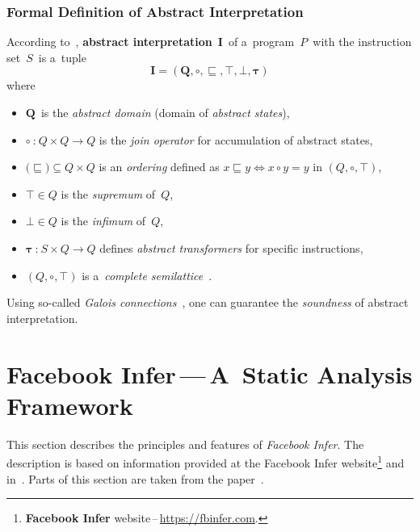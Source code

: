 \subsubsection{Formal Definition of Abstract Interpretation}

According to~\cite{AILatticeModelCousot, favAI},
\textbf{abstract interpretation}~$ \boldsymbol{I} $~of a~program~$ P $~with
the instruction set~$ S $~is a~tuple
$$ \boldsymbol{I = (Q, \circ, \sqsubseteq, \top, \bot, \tau)} $$
where
\begin{itemize}
    \item
        $ \boldsymbol{Q} $~is the \emph{abstract domain} (domain of
        \emph{abstract states}),

    \item
        $ \boldsymbol{\circ}~\text{:}~Q \times Q \rightarrow Q $
        is the \emph{join operator} for accumulation of abstract states,

    \item
        $ \text{(}\boldsymbol{\sqsubseteq}\text{)} \subseteq Q \times Q $ is
        an \emph{ordering} defined as
        $ x \sqsubseteq y \Leftrightarrow x \circ y = y $ in
        $ (Q, \circ, \top) $,

    \item
        $ \boldsymbol{\top} \in Q $ is the \emph{supremum} of~$ Q $,

    \item
        $ \boldsymbol{\bot} \in Q $ is the \emph{infimum} of~$ Q $,

    \item
        $ \boldsymbol{\tau}~\text{:}~S \times Q \rightarrow Q $
        defines \emph{abstract transformers} for specific instructions,

    \item
        $ (Q, \circ, \top) $ is a~\emph{complete
        semilattice}~\cite{favLatticesAndFixpoints, favAI}.
\end{itemize}

Using so-called \emph{Galois connections}~\cite{programAnalysisNielson,
wideningNarrowingCousot, favAI, AICousotWeb}, one can guarantee the
\emph{soundness} of abstract interpretation.


\section{\texorpdfstring{Facebook Infer\,---\,A~Static Analysis Framework}{}}
\label{sec:fbinfer}

This section describes the principles and features of
\emph{Facebook Infer}. The description is based on information provided
at the Facebook Infer website\footnote{\textbf{Facebook Infer}
website\,--\,\url{https://fbinfer.com}.} and in~\cite{inferAISlides,
projectPracticeMarcin2018}. Parts of this section are taken
from the paper~\cite{excel2019FBInfer}.

